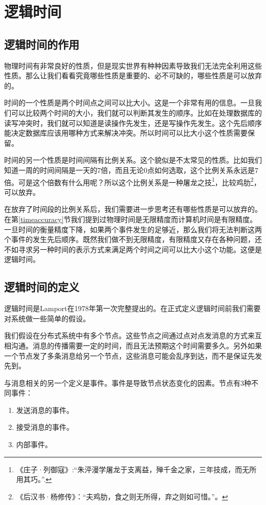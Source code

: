 \section{逻辑时间}
\label{logictime}

\subsection{逻辑时间的作用}

物理时间有非常良好的性质，但是现实世界有种种因素导致我们无法完全利用这些性质。那么让我们看看究竟哪些性质是重要的、必不可缺的，哪些性质是可以放弃的。

时间的一个性质是两个时间点之间可以比大小。这是一个非常有用的信息。一旦我们可以比较两个时间的大小，我们就可以判断其发生的顺序。比如在处理数据库的读写冲突时，我们就可以知道是读操作先发生，还是写操作先发生。这个先后顺序能决定数据库应该用哪种方式来解决冲突。所以时间可以比大小这个性质需要保留。

时间的另一个性质是时间间隔有比例关系。这个貌似是不太常见的性质。比如我们知道一周的时间间隔是一天的7倍，而且无论0点如何选取，这个比例关系永远是7倍。可是这个倍数有什么用呢？所以这个比例关系是一种屠龙之技\footnote{《庄子·列御寇》:“朱泙漫学屠龙于支离益，殚千金之家，三年技成，而无所用其巧。”.}，比较鸡肋\footnote{《后汉书·杨修传》：“夫鸡肋，食之则无所得，弃之则如可惜。”。}，可以放弃。


在放弃了时间段的比例关系后，我们需要进一步思考还有哪些性质是可以放弃的。在第\ref{timeaccuracy}节我们提到过物理时间是无限精度而计算机时间是有限精度。一旦时间的衡量精度下降，如果两个事件发生的足够近，那么我们将无法判断这两个事件的发生先后顺序。既然我们做不到无限精度，有限精度又存在各种问题，还不如寻求另一种时间的表示方式来满足两个时间之间可以比大小这个功能。这便是逻辑时间。


\subsection{逻辑时间的定义}

逻辑时间是Lamport在1978年第一次完整提出的\cite{Lamport1978}。在正式定义逻辑时间前我们需要对系统做一些简单的假设。

我们假设在分布式系统中有多个节点。这些节点之间通过点对点发消息的方式来互相沟通。消息的传播需要一定的时间，而且无法预期这个时间需要多久。另外如果一个节点发了多条消息给另一个节点，这些消息可能会乱序到达，而不是保证先发先到。

与消息相关的另一个定义是事件。事件是导致节点状态变化的因素。节点有3种不同事件：
\begin{enumerate}
    \item 发送消息的事件。
    \item 接受消息的事件。
    \item 内部事件。
\end{enumerate}

